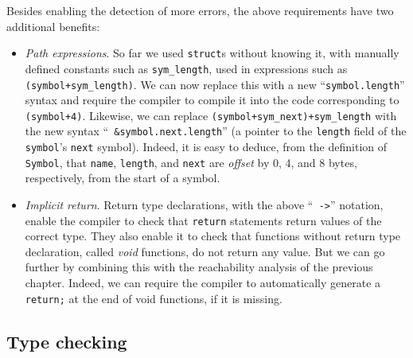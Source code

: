 Besides enabling the detection of more errors, the above requirements have two
additional benefits:
\begin{itemize}
  \item {\em Path expressions}. So far we used {\tt struct}s without knowing
  it, with manually defined constants such as {\tt sym\_length}, used in
  expressions such as {\tt *(symbol+sym\_length)}. We can now replace this with
  a new ``{\tt symbol.length}'' syntax and require the compiler to compile it
  into the code corresponding to {\tt *(symbol+4)}. Likewise, we can replace
  {\tt *(symbol+sym\_next)+sym\_length} with the new syntax ``{\tt
  \&symbol.next.length}'' (a pointer to the {\tt length} field of the {\tt
  symbol}'s {\tt next} symbol). Indeed, it is easy to deduce, from the
  definition of {\tt Symbol}, that {\tt name}, {\tt length}, and {\tt next} are
  {\em offset} by 0, 4, and 8 bytes, respectively, from the start of a symbol.

  \item {\em Implicit return}. Return type declarations, with the above ``{\tt
  ->}'' notation, enable the compiler to check that {\tt return} statements
  return values of the correct type. They also enable it to check that
  functions without return type declaration, called {\em void} functions, do
  not return any value. But we can go further by combining this with the
  reachability analysis of the previous chapter. Indeed, we can require the
  compiler to automatically generate a {\tt return;} at the end of void
  functions, if it is missing.
\end{itemize}

\subsection{Type checking}\label{subsection:type-checking}

